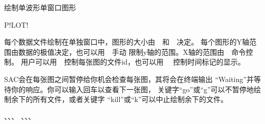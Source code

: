 \label{cmd:plot}

绘制单波形单窗口图形

\begin{SACSTX}
P!LOT!
\end{SACSTX}

每个数据文件绘制在单独窗口中，图形的大小由~~和~~决定。
每个图形的Y轴范围由数据的极值决定，也可以用~~手动
限制y轴的范围。X轴的范围由~~命令控制。
用户可以用~~控制每张图的文件id，也可以用
~~控制时间标记的显示。

SAC会在每张图之间暂停给你机会检查每张图，其将会在终端输出
``Waiting''并等待你的响应。你可以输入回车以查看下一张图，
关键字``go''或``g''可以不暂停地绘制余下的所有文件，或者关键字
``kill''或``k''可以中止绘制余下的文件。

、、、
、、、
